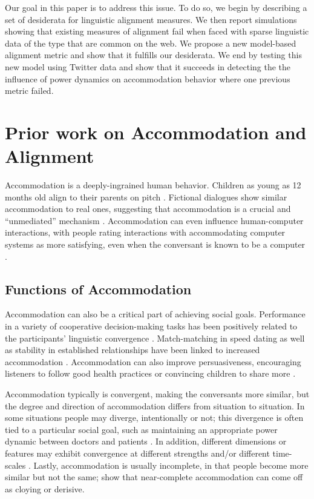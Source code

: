 \documentclass{acm_proc_article-sp}
\begin{document}
Our  goal in this paper is to address this issue. To do so, we begin by describing a set of desiderata for linguistic alignment measures. We then report simulations showing that existing measures of alignment fail when faced with sparse linguistic data of the type that are common on the web. We propose a new model-based alignment metric and show that it fulfills our desiderata. We end by testing this new model using Twitter data and show that it succeeds in detecting the the influence of power dynamics on accommodation behavior where one previous metric failed. 

\section{Prior work on Accommodation and Alignment}

Accommodation is a deeply-ingrained human behavior.  Children as young as 12 months old align to their parents on pitch \cite{Lieberman1967}.  Fictional dialogues show similar accommodation to real ones, suggesting that accommodation is a crucial and ``unmediated'' mechanism \cite{PickeringGarrod2004,DNMLee2011}.  Accommodation can even influence human-computer interactions, with people rating interactions with accommodating computer systems as more satisfying, even when the conversant is known to be a computer \cite{NassLee2000,vanBaarenEtAl2003,BraniganEtAl2010}.

\subsection{Functions of Accommodation}
Accommodation can also be a critical part of achieving social goals.  Performance in a variety of cooperative decision-making tasks has been positively related to the participants' linguistic convergence \cite{FusaroliEtAl2012,KacewiczEtAl2013}.  Match-matching in speed dating as well as stability in established relationships have been linked to increased accommodation \cite{IrelandEtAl2011}.  Accommodation can also improve persuasiveness, encouraging listeners to follow good health practices \cite{KlineCeropski1984} or convincing children to share more \cite{BurlesonFennelly1981}.

Accommodation typically is convergent, making the conversants more similar, but the degree and direction of accommodation differs from situation to situation. In some situations people may diverge, intentionally or not; this divergence is often tied to a particular social goal, such as maintaining an appropriate power dynamic between doctors and patients \cite{Ferrara1991}. In addition, different dimensions or features may exhibit convergence at different strengths \cite{ThakerarGilesCheshire1982,BilousKrauss1988,DNMGamonDumais2011} and/or different time-scales \cite{Ferrara1991}.  Lastly, accommodation is usually incomplete, in that people become more similar but not the same; \cite{GilesCouplandCoupland1991,GilesSmith1979} show that near-complete accommodation can come off as cloying or derisive.
\end{document}
